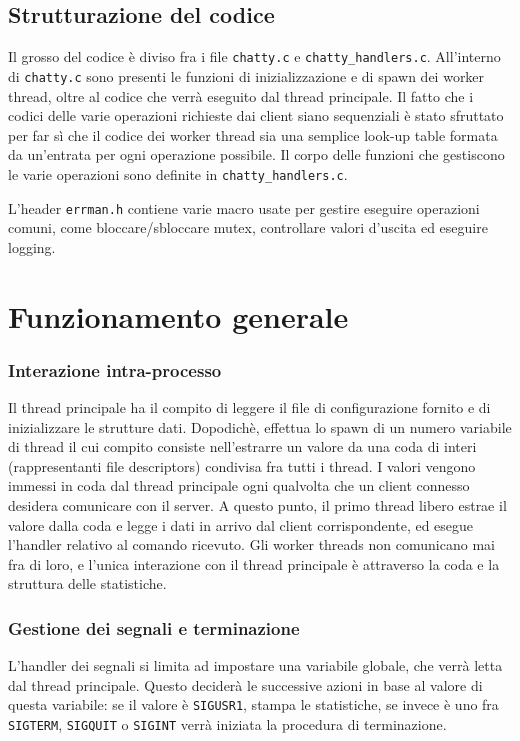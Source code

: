 \documentclass[11pt]{article} %
\begin{document}
\subsection{Strutturazione del codice}
Il grosso del codice è diviso fra i file \texttt{chatty.c} e \texttt{chatty\_handlers.c}. All'interno di \texttt{chatty.c} sono presenti le funzioni di inizializzazione e di spawn dei worker thread, oltre al codice che verrà eseguito dal thread principale. Il fatto che i codici delle varie operazioni richieste dai client siano sequenziali è stato sfruttato per far sì che il codice dei worker thread sia una semplice look-up table formata da un'entrata per ogni operazione possibile. Il corpo delle funzioni che gestiscono le varie operazioni sono definite in \texttt{chatty\_handlers.c}.

L'header \texttt{errman.h} contiene varie macro usate per gestire eseguire operazioni comuni, come bloccare/sbloccare mutex, controllare valori d'uscita ed eseguire logging.

\section{Funzionamento generale}
\subsubsection{Interazione intra-processo}
Il thread principale ha il compito di leggere il file di configurazione fornito e di inizializzare le strutture dati. Dopodichè, effettua lo spawn di un numero variabile di thread il cui compito consiste nell'estrarre un valore da una coda di interi (rappresentanti file descriptors) condivisa fra tutti i thread. I valori vengono immessi in coda dal thread principale ogni qualvolta che un client connesso desidera comunicare con il server. A questo punto, il primo thread libero estrae il valore dalla coda e legge i dati in arrivo dal client corrispondente, ed esegue l'handler relativo al comando ricevuto. Gli worker threads non comunicano mai fra di loro, e l'unica interazione con il thread principale è attraverso la coda e la struttura delle statistiche.

\subsubsection{Gestione dei segnali e terminazione}
L'handler dei segnali si limita ad impostare una variabile globale, che verrà letta dal thread principale. Questo deciderà le successive azioni in base al valore di questa variabile: se il valore è \texttt{SIGUSR1}, stampa le statistiche, se invece è uno fra \texttt{SIGTERM}, \texttt{SIGQUIT} o \texttt{SIGINT} verrà iniziata la procedura di terminazione.
\end{document}
